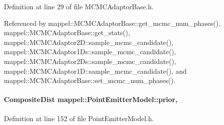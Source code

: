 Definition at line 29 of file M\+C\+M\+C\+Adaptor\+Base.\+h.



Referenced by mappel\+::\+M\+C\+M\+C\+Adaptor\+Base\+::get\+\_\+mcmc\+\_\+num\+\_\+phases(), mappel\+::\+M\+C\+M\+C\+Adaptor\+Base\+::get\+\_\+stats(), mappel\+::\+M\+C\+M\+C\+Adaptor2\+D\+::sample\+\_\+mcmc\+\_\+candidate(), mappel\+::\+M\+C\+M\+C\+Adaptor1\+Ds\+::sample\+\_\+mcmc\+\_\+candidate(), mappel\+::\+M\+C\+M\+C\+Adaptor2\+Ds\+::sample\+\_\+mcmc\+\_\+candidate(), mappel\+::\+M\+C\+M\+C\+Adaptor1\+D\+::sample\+\_\+mcmc\+\_\+candidate(), and mappel\+::\+M\+C\+M\+C\+Adaptor\+Base\+::set\+\_\+mcmc\+\_\+num\+\_\+phases().

\paragraph[{\texorpdfstring{prior}{prior}}]{\setlength{\rightskip}{0pt plus 5cm}Composite\+Dist mappel\+::\+Point\+Emitter\+Model\+::prior\hspace{0.3cm}{\ttfamily [protected]}, {\ttfamily [inherited]}}\hypertarget{classmappel_1_1PointEmitterModel_a393839f8eb1dd3d61c9369377742ba0e}{}\label{classmappel_1_1PointEmitterModel_a393839f8eb1dd3d61c9369377742ba0e}


Definition at line 152 of file Point\+Emitter\+Model.\+h.



